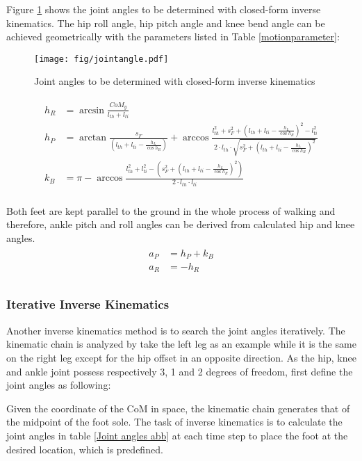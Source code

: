 Figure {\ref{jointangles}} shows the joint angles to be determined with closed-form inverse kinematics. The hip roll angle, hip pitch angle and knee bend angle can be achieved geometrically with the parameters listed in Table {\ref{motionparameter}}:
\begin{figure}[H]
	\centering
	\texttt{[image: fig/jointangle.pdf]}
	\caption{Joint angles to be determined with closed-form inverse kinematics}
	\label{jointangles}
\end{figure}

\begin{align}
	\begin{split}
		h_R &= \arcsin \frac{\mathit{CoM_y}}{l_{th}+l_{ti}}\\
		h_P &= \arctan\frac{s_F}{\left(l_{th}+l_{ti}-\frac{h_L}{\cos h_R}\right)}+\arccos \frac{l_{th}^2+s_F^2+\left(l_{th}+l_{ti}-\frac{h_L}{\cos h_R}\right)^2-l_{ti}^2}{2\cdot l_{th}\cdot \sqrt{s_F^2+\left(l_{th}+l_{ti}-\frac{h_L}{\cos h_R}\right)^2}}\\
		k_B &= \pi - \arccos \frac{l_{th}^2+l_{ti}^2-\left(s_F^2+\left(l_{th}+l_{ti}-\frac{h_L}{\cos h_R}\right)^2\right)}{2\cdot l_{th}\cdot l_{ti}}\\
	\end{split}
\end{align}

Both feet are kept parallel to the ground in the whole process of walking and therefore, ankle pitch and roll angles can be derived from calculated hip and knee angles.
\begin{align}
\label{anklejoint}
	\begin{split}
		a_P &= h_P+k_B\\
		a_R &= -h_R\\
	\end{split}
\end{align}


\subsubsection{Iterative Inverse Kinematics}
Another inverse kinematics method is to search the joint angles iteratively. 
The kinematic chain is analyzed by take the left leg as an example while it is the same on the right leg except for the hip offset in an opposite direction. 	
As the hip, knee and ankle joint possess respectively 3, 1 and 2 degrees of freedom, first define the joint angles as following: 


Given the coordinate of the CoM in space, the kinematic chain generates that of the midpoint of the foot sole. The task of inverse kinematics is to calculate the joint angles in table {\ref{Joint angles abb}} at each time step to place the foot at the desired location, which is predefined.


